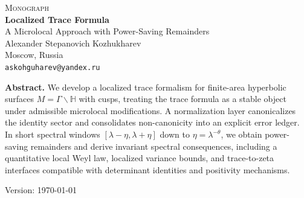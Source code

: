 \documentclass[11pt,oneside]{book}
\numberwithin{equation}{section}
\begin{document}
\frontmatter

\begin{titlepage}
  \centering
  \vspace*{6mm}

  {\Large\scshape Monograph}\\[12mm]
  {\LARGE\bfseries Localized Trace Formula}\\[4mm]
  {\large A Microlocal Approach with Power-Saving Remainders}\\[16mm]

  {\large Alexander Stepanovich Kozhukharev}\\[2mm]
  Moscow, Russia\\[2mm]
  \texttt{askohguharev@yandex.ru}\\[14mm]

  \vfill

  \begin{tcolorbox}[
    colback=white,
    colframe=black!15,
    sharp corners,
    boxrule=0.3pt,
    left=15pt,right=15pt,top=15pt,bottom=15pt
  ]
    \small
    \textbf{Abstract.}\;
    We develop a localized trace formalism for finite-area hyperbolic surfaces
    $M=\Gamma\backslash\mathbb{H}$ with cusps, treating the trace formula as a stable
    object under admissible microlocal modifications.  A normalization layer
    canonicalizes the identity sector and consolidates non-canonicity into an explicit
    error ledger.  In short spectral windows $[\lambda-\eta,\lambda+\eta]$ down to
    $\eta=\lambda^{-\theta}$, we obtain power-saving remainders and derive invariant
    spectral consequences, including a quantitative local Weyl law, localized variance
    bounds, and trace-to-zeta interfaces compatible with determinant identities and
    positivity mechanisms.
  \end{tcolorbox}

  \vfill
  {\small Version: \today}
\end{titlepage}

\tableofcontents

\end{document}
